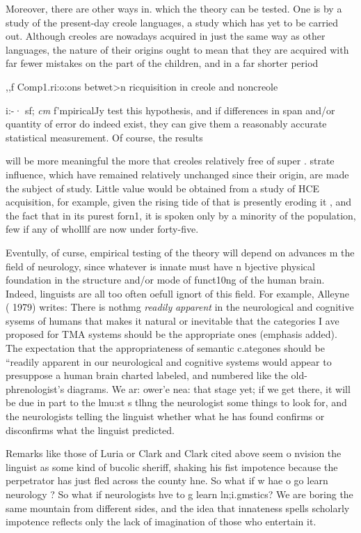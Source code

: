 Moreover, there are other ways in. which the theory can be tested. One is by a study of the present-day  creole languages, a study which has yet to be carried out. Although creoles are nowadays acquired in just the same way as other languages, the nature of their origins ought to mean that they are acquired with far fewer mistakes on the part of the children, and in a far shorter period

,,f Comp1.ri:o:ons betwet{\textgreater}n ricquisition in creole and noncreole

i:-· sf; \textit{cm} f'mpiricalJy test this hypothesis, and if differences in  span and/or quantity of error do indeed exist, they can give them a reasonably accurate statistical measurement. Of course, the results

will be more meaningful the more that creoles relatively free of super . strate influence, which have remained relatively unchanged since their origin, are made the subject of study. Little value would be obtained from a study of HCE acquisition, for example, given the rising tide of  that is presently eroding it , and the fact that in its purest forn1, it is spoken only by a minority of the population, few if any of wholllf are now under forty-five.


Eventully, of curse, empirical testing of the theory will depend on advances m the field of neurology, since whatever is innate must have n bjective physical foundation in the structure and/or mode of funct10ng of the human brain. Indeed, linguists are all too often oefull ignort of this field. For example, Alleyne ( 1979) writes: There is nothmg \textit{readily} \textit{apparent} in the neurological and cognitive sysems of humans that makes it natural or inevitable that the cate\-gories I ave proposed for TMA systems should be the appropriate ones
(emphasis added). The expectation that the appropriateness of semantic c.ategones should be ``readily apparent in our neurological and cogni\-tive systems would appear to presuppose a human brain charted labeled, and numbered like the old- phrenologist's diagrams. We ar: ower'e nea: that stage yet; if we get there, it will be due in part to the lmu:st s tlhng the neurologist some things to look for, and the neurologists telling the linguist whether what he has found confirms or disconfirms what the linguist predicted.

Remarks like those of Luria or Clark and Clark cited above seem o nvision the linguist as some kind of bucolic sheriff, shaking his fist impotence because the perpetrator has just fled across the county hne. So what if w hae o go learn neurology ? So what if neurologists hve to g learn ln;i.gmstics? We are boring the same mountain from different sides, and the idea that innateness spells scholarly impotence
reflects only the lack of imagination of those who entertain it.

